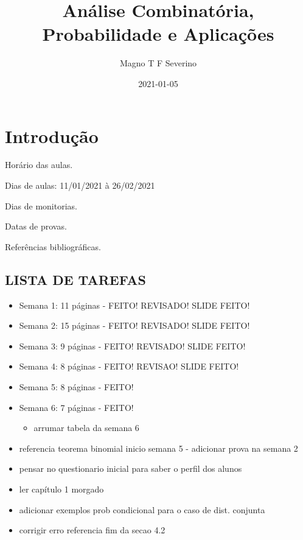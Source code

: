 \documentclass[]{book}
\title{Análise Combinatória, Probabilidade e Aplicações}
\author{Magno T F Severino}
\date{2021-01-05}
\providecommand{\tightlist}{%
  \setlength{\itemsep}{0pt}\setlength{\parskip}{0pt}}
\theoremstyle{definition}
\theoremstyle{definition}
\theoremstyle{definition}
\theoremstyle{remark}
\begin{document}
\maketitle

{
\setcounter{tocdepth}{1}
\tableofcontents
}
\hypertarget{introduuxe7uxe3o}{%
\chapter*{Introdução}\label{introduuxe7uxe3o}}

Horário das aulas.

Dias de aulas: 11/01/2021 à 26/02/2021

Dias de monitorias.

Datas de provas.

Referências bibliográficas.

\hypertarget{lista-de-tarefas}{%
\section*{LISTA DE TAREFAS}\label{lista-de-tarefas}}

\begin{itemize}
\tightlist
\item
  Semana 1: 11 páginas - FEITO! REVISADO! SLIDE FEITO!
\item
  Semana 2: 15 páginas - FEITO! REVISADO! SLIDE FEITO!
\item
  Semana 3: 9 páginas - FEITO! REVISADO! SLIDE FEITO!
\item
  Semana 4: 8 páginas - FEITO! REVISAO! SLIDE FEITO!
\item
  Semana 5: 8 páginas - FEITO!
\item
  Semana 6: 7 páginas - FEITO!

  \begin{itemize}
  \tightlist
  \item
    arrumar tabela da semana 6
  \end{itemize}
\item
  referencia teorema binomial inicio semana 5 - adicionar prova na semana 2
\item
  pensar no questionario inicial para saber o perfil dos alunos
\item
  ler capítulo 1 morgado
\item
  adicionar exemplos prob condicional para o caso de dist. conjunta
\item
  corrigir erro referencia fim da secao 4.2
\end{itemize}
\end{document}
